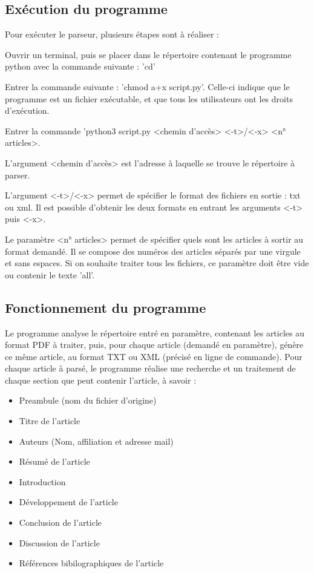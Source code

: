 \documentclass[11pt,a4paper]{article}
\begin{document}
\subsection{Exécution du programme}

Pour exécuter le parseur, plusieurs étapes sont à réaliser : 

\begin{etapes}
\item  Ouvrir un terminal, puis se placer dans le répertoire contenant le programme python avec la commande suivante : 'cd'
\item Entrer la commande suivante : 'chmod a+x script.py'. Celle-ci indique que le programme est un fichier exécutable, et que tous les utilisateurs ont les droits d'exécution.
\item Entrer la commande 'python3 script.py <chemin d'accès> <-t>/<-x> <n° articles>.

L'argument <chemin d'accès> est l'adresse à laquelle se trouve le répertoire à parser.

L'argument <-t>/<-x> permet de spécifier le format des fichiers en sortie : txt ou xml. Il est possible d'obtenir les deux formats en entrant les arguments <-t> puis <-x>.

Le paramètre <n° articles> permet de spécifier quels sont les articles à sortir au format demandé. Il se compose des numéros des articles séparés par une virgule et sans espaces. Si on souhaite traiter tous les fichiers, ce paramètre doit être vide ou contenir le texte 'all'.

\end{etapes}

\subsection{Fonctionnement du programme}

Le programme analyse le répertoire entré en paramètre, contenant les articles au format PDF à traiter, puis, pour chaque article (demandé en paramètre), génère ce même article, au format TXT ou XML (précisé en ligne de commande).
Pour chaque article à parsé, le programme réalise une recherche et un traitement de chaque section que peut contenir l'article, à savoir :

\begin{itemize}

\item Preambule (nom du fichier d'origine)
\item Titre de l'article
\item Auteurs (Nom, affiliation et adresse mail)
\item Résumé de l'article
\item Introduction
\item Développement de l'article
\item Conclusion de l'article
\item Discussion de l'article
\item Références bibilographiques de l'article
\end{itemize}
\end{document}
